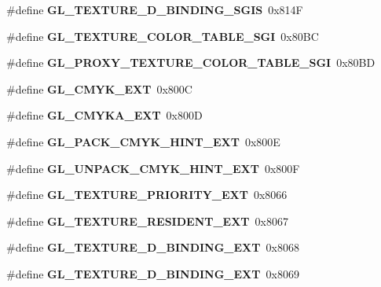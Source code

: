 \begin{DoxyCompactItemize}
\item 
\#define {\bfseries G\+L\+\_\+\+T\+E\+X\+T\+U\+R\+E\+\_\+D\+\_\+\+B\+I\+N\+D\+I\+N\+G\+\_\+\+S\+G\+I\+S}~0x814\+F\label{_s_d_l__opengl_8h_a10229b350d518376f110fbabc4c3228b}

\item 
\#define {\bfseries G\+L\+\_\+\+T\+E\+X\+T\+U\+R\+E\+\_\+\+C\+O\+L\+O\+R\+\_\+\+T\+A\+B\+L\+E\+\_\+\+S\+G\+I}~0x80\+B\+C\label{_s_d_l__opengl_8h_a0e2dc494e03bb00801c9ee4af6415402}

\item 
\#define {\bfseries G\+L\+\_\+\+P\+R\+O\+X\+Y\+\_\+\+T\+E\+X\+T\+U\+R\+E\+\_\+\+C\+O\+L\+O\+R\+\_\+\+T\+A\+B\+L\+E\+\_\+\+S\+G\+I}~0x80\+B\+D\label{_s_d_l__opengl_8h_aba618a6b554e101ec809f28d485b7bba}

\item 
\#define {\bfseries G\+L\+\_\+\+C\+M\+Y\+K\+\_\+\+E\+X\+T}~0x800\+C\label{_s_d_l__opengl_8h_a7e2eaa6abf9120b74a174f842b2c49b4}

\item 
\#define {\bfseries G\+L\+\_\+\+C\+M\+Y\+K\+A\+\_\+\+E\+X\+T}~0x800\+D\label{_s_d_l__opengl_8h_a625a98c7711316e11aa9a6424839b9ef}

\item 
\#define {\bfseries G\+L\+\_\+\+P\+A\+C\+K\+\_\+\+C\+M\+Y\+K\+\_\+\+H\+I\+N\+T\+\_\+\+E\+X\+T}~0x800\+E\label{_s_d_l__opengl_8h_a2c75898afd7ab3984930a43e6692cb3f}

\item 
\#define {\bfseries G\+L\+\_\+\+U\+N\+P\+A\+C\+K\+\_\+\+C\+M\+Y\+K\+\_\+\+H\+I\+N\+T\+\_\+\+E\+X\+T}~0x800\+F\label{_s_d_l__opengl_8h_a82a058f6c4681586d5de755618138047}

\item 
\#define {\bfseries G\+L\+\_\+\+T\+E\+X\+T\+U\+R\+E\+\_\+\+P\+R\+I\+O\+R\+I\+T\+Y\+\_\+\+E\+X\+T}~0x8066\label{_s_d_l__opengl_8h_aeaf823693e15ce70d2451103c9d985f9}

\item 
\#define {\bfseries G\+L\+\_\+\+T\+E\+X\+T\+U\+R\+E\+\_\+\+R\+E\+S\+I\+D\+E\+N\+T\+\_\+\+E\+X\+T}~0x8067\label{_s_d_l__opengl_8h_a9db08a400e9b3173a43ad05cef09ea11}

\item 
\#define {\bfseries G\+L\+\_\+\+T\+E\+X\+T\+U\+R\+E\+\_\+D\+\_\+\+B\+I\+N\+D\+I\+N\+G\+\_\+\+E\+X\+T}~0x8068\label{_s_d_l__opengl_8h_ab8c6077ddd57e913fb87a8f65aaea198}

\item 
\#define {\bfseries G\+L\+\_\+\+T\+E\+X\+T\+U\+R\+E\+\_\+D\+\_\+\+B\+I\+N\+D\+I\+N\+G\+\_\+\+E\+X\+T}~0x8069\label{_s_d_l__opengl_8h_aee0c8b993963c6bc540106c2322cc855}


\end{DoxyCompactItemize}
